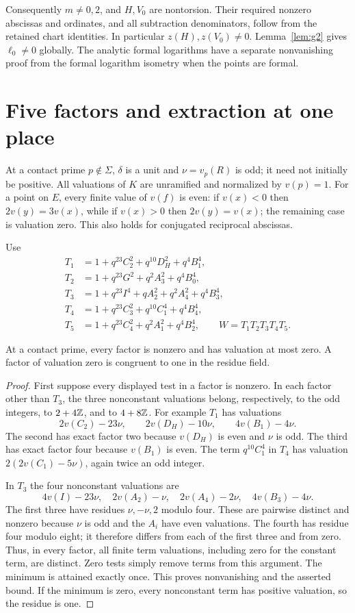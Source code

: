 \documentclass[11pt,a4paper]{article}
\begin{document}
Consequently $m\ne0,2$, and $H,V_0$ are nontorsion. Their required
nonzero abscissas and ordinates, and all subtraction denominators,
follow from the retained chart identities. In particular
$z(H),z(V_0)\ne0$. Lemma~\ref{lem:g2} gives $\ell_0\ne0$ globally.
The analytic formal logarithms have a separate nonvanishing proof
from the formal logarithm isometry when the points are formal.

\section{Five factors and extraction at one place}
At a contact prime $p\notin\Sigma$, $\delta$ is a unit and
$\nu=v_p(R)$ is odd; it need not initially be positive. All valuations
of $K$ are unramified and normalized by $v(p)=1$.
For a point on $E$, every finite value of $v(f)$ is even: if
$v(x)<0$ then $2v(y)=3v(x)$, while if $v(x)>0$ then
$2v(y)=v(x)$; the remaining case is valuation zero.
This also holds for conjugated reciprocal abscissas.

Use
\begin{align*}
 T_1&=1+q^{23}C_2^2+q^{10}D_H^2+q^4B_1^4,\\
 T_2&=1+q^{23}G^2+q^2A_3^2+q^4B_0^4,\\
 T_3&=1+q^{23}I^4+qA_2^2+q^2A_4^2+q^4B_3^4,\\
 T_4&=1+q^{23}C_3^2+q^{10}C_1^4+q^4B_4^4,\\
 T_5&=1+q^{23}C_4^2+q^2A_1^2+q^4B_2^4,
 \qquad W=T_1T_2T_3T_4T_5.
\end{align*}

\begin{lemma}\label{lem:residues}
At a contact prime, every factor is nonzero and has valuation at most
zero. A factor of valuation zero is congruent to one in the residue field.
\end{lemma}
\begin{proof}
First suppose every displayed test in a factor is nonzero. In each
factor other than $T_3$, the three nonconstant valuations belong,
respectively, to the odd integers, to $2+4\mathbb Z$, and to $4+8\mathbb Z$.
For example $T_1$ has valuations
\[
 2v(C_2)-23\nu,\qquad 2v(D_H)-10\nu,\qquad4v(B_1)-4\nu.
\]
The second has exact factor two because $v(D_H)$ is even and $\nu$ is
odd. The third has exact factor four because $v(B_1)$ is even.
The term $q^{10}C_1^4$ in $T_4$ has valuation
$2(2v(C_1)-5\nu)$, again twice an odd integer.

In $T_3$ the four nonconstant valuations are
\[
 4v(I)-23\nu,\quad 2v(A_2)-\nu,\quad
 2v(A_4)-2\nu,\quad4v(B_3)-4\nu.
\]
The first three have residues $\nu,-\nu,2$ modulo four. These are
pairwise distinct and nonzero because $\nu$ is odd and the $A_i$
have even valuations. The fourth has residue four modulo eight;
it therefore differs from each of the first three and from zero.
Thus, in every factor, all finite term valuations, including zero
for the constant term, are distinct. Zero tests simply remove terms
from this argument. The minimum is attained exactly once. This proves
nonvanishing and the asserted bound. If the minimum is zero, every
nonconstant term has positive valuation, so the residue is one.
\end{proof}
\end{document}
